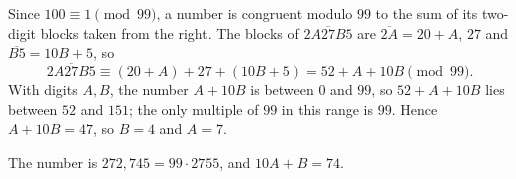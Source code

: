 Since $100\equiv1\pmod{99}$, a number is congruent modulo $99$ to the sum of its two-digit blocks taken from the right. The blocks of $\overline{2A27B5}$ are $\overline{2A}=20+A$, $27$ and $\overline{B5}=10B+5$, so
\[\overline{2A27B5}\equiv(20+A)+27+(10B+5)=52+A+10B\pmod{99}.\]
With digits $A,B$, the number $A+10B$ is between $0$ and $99$, so $52+A+10B$ lies between $52$ and $151$; the only multiple of $99$ in this range is $99$. Hence $A+10B=47$, so $B=4$ and $A=7$.

The number is $272{,}745=99\cdot2755$, and $10A+B=\boxed{74}$.
